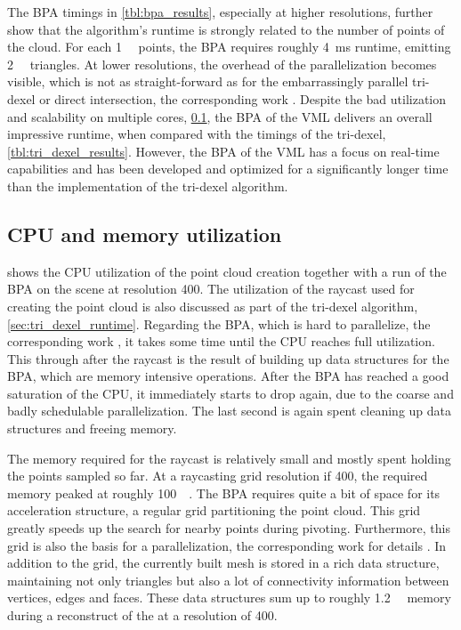 The BPA timings in \cref{tbl:bpa_results}, especially at higher resolutions, further show that the algorithm's runtime is strongly related to the number of points of the cloud.
For each \SI{1}{\kilo\nothing} points, the BPA requires roughly \SI{4}{\milli\second} runtime, emitting \SI{2}{\kilo\nothing} triangles.
At lower resolutions, the overhead of the parallelization becomes visible, which is not as straight-forward as for the embarrassingly parallel tri-dexel or direct intersection, \cf the corresponding work \cite{bpa_vml}.
Despite the bad utilization and scalability on multiple cores, \cf \cref{sec:bpa_utilization}, the BPA of the VML delivers an overall impressive runtime, when compared with the timings of \eg the tri-dexel, \cf \cref{tbl:tri_dexel_results}.
However, the BPA of the VML has a focus on real-time capabilities and has been developed and optimized for a significantly longer time than the implementation of the tri-dexel algorithm.


\subsection{CPU and memory utilization}
\label{sec:bpa_utilization}

 shows the CPU utilization of the point cloud creation together with a run of the BPA on the \impeller scene at resolution 400.
The utilization of the raycast used for creating the point cloud is also discussed as part of the tri-dexel algorithm, \cf \cref{sec:tri_dexel_runtime}.
Regarding the BPA, which is hard to parallelize, \cf the corresponding work \cite{bpa_vml}, it takes some time until the CPU reaches full utilization.
This through after the raycast is the result of building up data structures for the BPA, which are memory intensive operations.
After the BPA has reached a good saturation of the CPU, it immediately starts to drop again, due to the coarse and badly schedulable parallelization.
The last second is again spent cleaning up data structures and freeing memory.

The memory required for the raycast is relatively small and mostly spent holding the points sampled so far.
At a raycasting grid resolution if 400, the required memory peaked at roughly \SI{100}{\mebi\byte}.
The BPA requires quite a bit of space for its acceleration structure, a regular grid partitioning the point cloud.
This grid greatly speeds up the search for nearby points during pivoting.
Furthermore, this grid is also the basis for a parallelization, \cf the corresponding work for details \cite{bpa_vml}.
In addition to the grid, the currently built mesh is stored in a rich data structure, maintaining not only triangles but also a lot of connectivity information between vertices, edges and faces.
These data structures sum up to roughly \SI{1.2}{\gibi\byte} memory during a reconstruct of the \impeller at a resolution of 400.


